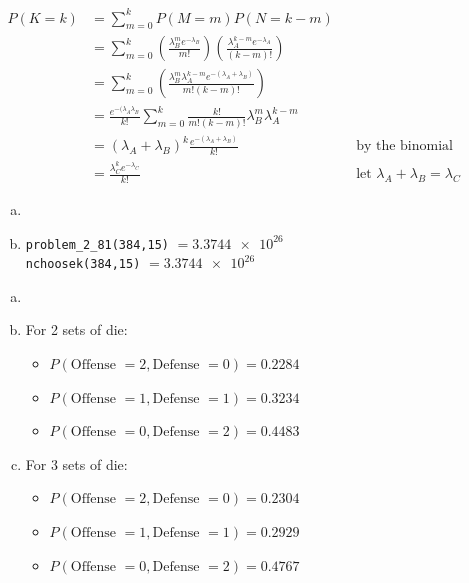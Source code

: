 \documentclass[12pt]{article}
\newenvironment{problem}[2][Problem]{\begin{trivlist}
\item[\hskip \labelsep {\bfseries #1}\hskip \labelsep {\bfseries #2.}]
  \vspace{1 cm}
}{\end{trivlist}}
\begin{document}
\newpage
\begin{problem}{2.67}
\item
  \begin{align*}
    P(K = k) &= \sum_{m=0}^k P(M=m)P(N=k-m) \\
    &= \sum_{m=0}^k \left( \frac{\lambda_B^m e^{-\lambda_B}}{m!} \right)
    \left( \frac{\lambda_A^{k-m} e^{-\lambda_A}}{(k-m)!} \right) \\
    &= \sum_{m=0}^k \left( \frac{\lambda_B^m \lambda_A^{k-m} e^{-(\lambda_A+\lambda_B)}}{m!(k-m)!} \right) \\
    &= \frac{e^{-(\lambda_A \lambda_B}}{k!} \sum_{m=0}^{k} \frac{k!}{m!(k-m)!}\lambda_B^m \lambda_A^{k-m} \\
    &= (\lambda_A + \lambda_B)^k \frac{e^{-(\lambda_A + \lambda_B)}}{k!} & & \textrm{by the binomial expansion} \\
    &= \frac{\lambda_C^k e^{-\lambda_C}}{k!} & & \textrm{let } \lambda_A + \lambda_B = \lambda_C
  \end{align*}
\end{problem}

\begin{problem}{2.81} 
\item
  \begin{enumerate}[a.]
    \item %
      
    \item %
      \verb|problem_2_81(384,15)| $ = \num{3.3744e26}$ \\
      \verb|nchoosek(384,15)| $ = \num{3.3744e26} $ 
  \end{enumerate}
\end{problem}

\newpage
\begin{problem}{2.83} 
\item
  \begin{enumerate}[a.]
    \item %
      
    \item %
            For 2 sets of die:
      \begin{itemize}
        \item $P(\textrm{Offense } = 2, \textrm{Defense }= 0) = 0.2284$
        \item $P(\textrm{Offense } = 1, \textrm{Defense }= 1) = 0.3234$
        \item $P(\textrm{Offense } = 0, \textrm{Defense }= 2) = 0.4483$
      \end{itemize}
     \item %
            For 3 sets of die:
      \begin{itemize}
        \item $P(\textrm{Offense } = 2, \textrm{Defense }= 0) = 0.2304$
        \item $P(\textrm{Offense } = 1, \textrm{Defense }= 1) = 0.2929$
        \item $P(\textrm{Offense } = 0, \textrm{Defense }= 2) = 0.4767$
      \end{itemize}
  \end{enumerate}
\end{problem}
\end{document}
